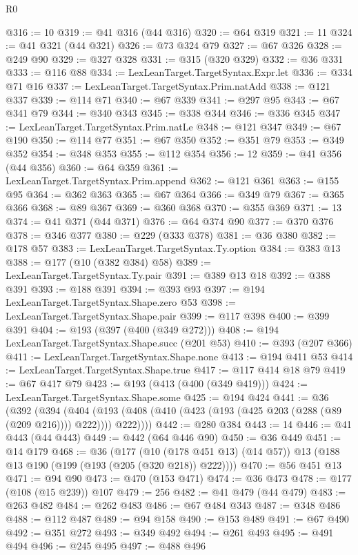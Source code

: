 \begin{lexlean}{R0}
\begin{coremodule}
@316 := 10
@319 := @41 @316 (@44 @316)
@320 := @64 @319
@321 := 11
@324 := @41 @321 (@44 @321)
@326 := @73 @324 @79
@327 := @67 @326
@328 := @249 @90
@329 := @327 @328
@331 := @315 (@320 @329)
@332 := @36 @331
@333 := @116 @88
@334 := LexLeanTarget.TargetSyntax.Expr.let
@336 := @334 @71 @16
@337 := LexLeanTarget.TargetSyntax.Prim.natAdd
@338 := @121 @337
@339 := @114 @71
@340 := @67 @339
@341 := @297 @95
@343 := @67 @341 @79
@344 := @340 @343
@345 := @338 @344
@346 := @336 @345
@347 := LexLeanTarget.TargetSyntax.Prim.natLe
@348 := @121 @347
@349 := @67 @190
@350 := @114 @77
@351 := @67 @350
@352 := @351 @79
@353 := @349 @352
@354 := @348 @353
@355 := @112 @354
@356 := 12
@359 := @41 @356 (@44 @356)
@360 := @64 @359
@361 := LexLeanTarget.TargetSyntax.Prim.append
@362 := @121 @361
@363 := @155 @95
@364 := @362 @363
@365 := @67 @364
@366 := @349 @79
@367 := @365 @366
@368 := @89 @367
@369 := @360 @368
@370 := @355 @369
@371 := 13
@374 := @41 @371 (@44 @371)
@376 := @64 @374 @90
@377 := @370 @376
@378 := @346 @377
@380 := @229 (@333 @378)
@381 := @36 @380
@382 := @178 @57
@383 := LexLeanTarget.TargetSyntax.Ty.option
@384 := @383 @13
@388 := @177 (@10 (@382 @384) @58)
@389 := LexLeanTarget.TargetSyntax.Ty.pair
@391 := @389 @13 @18
@392 := @388 @391
@393 := @188 @391
@394 := @393 @93
@397 := @194 LexLeanTarget.TargetSyntax.Shape.zero @53
@398 := LexLeanTarget.TargetSyntax.Shape.pair
@399 := @117 @398
@400 := @399 @391
@404 := @193 (@397 (@400 (@349 @272)))
@408 := @194 LexLeanTarget.TargetSyntax.Shape.succ (@201 @53)
@410 := @393 (@207 @366)
@411 := LexLeanTarget.TargetSyntax.Shape.none
@413 := @194 @411 @53
@414 := LexLeanTarget.TargetSyntax.Shape.true
@417 := @117 @414 @18 @79
@419 := @67 @417 @79
@423 := @193 (@413 (@400 (@349 @419)))
@424 := LexLeanTarget.TargetSyntax.Shape.some
@425 := @194 @424
@441 := @36
    (@392
      (@394
        (@404 (@193 (@408 (@410 (@423 (@193 (@425 @203 (@288 (@89 (@209 @216)))) @222)))) @222))))
@442 := @280 @384
@443 := 14
@446 := @41 @443 (@44 @443)
@449 := @442 (@64 @446 @90)
@450 := @36 @449
@451 := @14 @179
@468 := @36
    (@177 (@10 (@178 @451 @13) (@14 @57)) @13 (@188 @13 @190 (@199 (@193 (@205 (@320 @218)) @222))))
@470 := @56 @451 @13
@471 := @94 @90
@473 := @470 (@153 @471)
@474 := @36 @473
@478 := @177 (@108 (@15 @239)) @107
@479 := 256
@482 := @41 @479 (@44 @479)
@483 := @263 @482
@484 := @262 @483
@486 := @67 @484 @343
@487 := @348 @486
@488 := @112 @487
@489 := @94 @158
@490 := @153 @489
@491 := @67 @490
@492 := @351 @272
@493 := @349 @492
@494 := @261 @493
@495 := @491 @494
@496 := @245 @495
@497 := @488 @496

\end{coremodule}
\end{lexlean}

